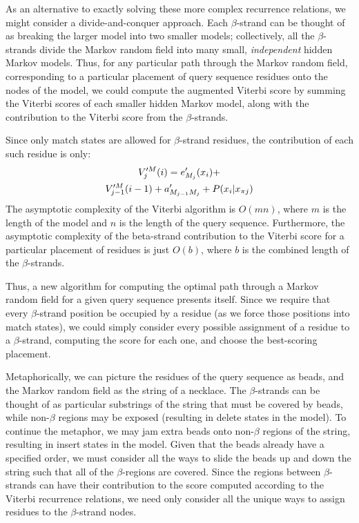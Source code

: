 \documentclass[blockstyle,times,preprint]{sigplanconf}
\begin{document}
As an alternative to exactly solving these more complex recurrence
relations, we might consider a divide-and-conquer approach.  Each
$\beta$-strand can be thought of as breaking the larger model into two
smaller models; collectively, all the $\beta$-strands divide the
Markov random field into many small, \emph{independent} hidden Markov
models.  Thus, for any particular path through the Markov random
field, corresponding to a particular placement of query sequence
residues onto the nodes of the model, we could compute the augmented
Viterbi score by summing the Viterbi scores of each smaller hidden
Markov model, along with the contribution to the Viterbi score from
the $\beta$-strands.

Since only match states are allowed for $\beta$-strand residues, the 
contribution of each such residue is only:
\begin{multline*}
  V_{j}^{\prime M}(i) = e^{\prime}_{M_{j}}(x_{i}) + \notag\\
V_{j-1}^{\prime M}(i - 1) + a^{\prime}_{M_{j-1}M_{j}} + P(x_{i}|x_{\pi j})
\end{multline*}
The asymptotic complexity of the Viterbi algorithm is $O(mn)$, where $m$ is the
length of the model and $n$ is the length of the query sequence.
Furthermore, the asymptotic complexity of the beta-strand contribution to the
Viterbi score for a particular placement of residues is just $O(b)$, where $b$
is the combined length of the $\beta$-strands.

Thus, a new algorithm for computing the optimal path through a Markov random 
field for a given query sequence presents itself.
Since we require that every $\beta$-strand position be occupied by a residue 
(as we force those positions into match states), we could simply consider every
possible assignment of a residue to a $\beta$-strand, computing the score for 
each one, and choose the best-scoring placement.

Metaphorically, we can picture the residues of the query sequence as beads,
and the Markov random field as the string of a necklace.
The $\beta$-strands can be thought of as particular substrings of the string 
that
must be covered by beads, while non-$\beta$ regions may be exposed (resulting in
delete states in the model).
To continue the metaphor, we may jam extra beads onto non-$\beta$ regions of the
string, resulting in insert states in the model.
Given that the beads already have a specified order, we must consider all the
ways to slide the beads up and down the string such that all of the 
$\beta$-regions
are covered.
Since the regions between $\beta$-strands can have their contribution to the
score computed according to the Viterbi recurrence relations, we need only
consider all the unique ways to assign residues to the $\beta$-strand nodes.
\end{document}
